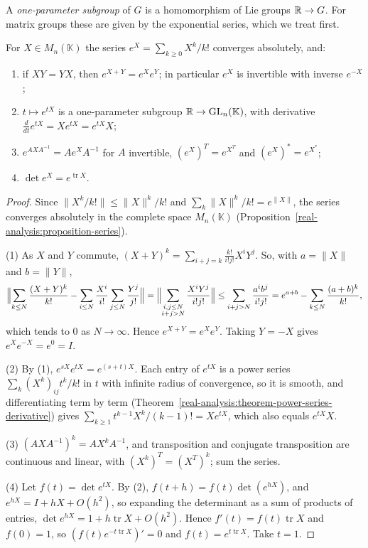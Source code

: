 A \emph{one-parameter subgroup} of $G$ is a homomorphism of Lie groups $\mathbb{R} \to G$. For matrix groups these are given by the exponential series, which we
treat first.

\begin{lemma}\label{lie-groups:lemma-matrix-exponential}
For $X \in M_n(\mathbb{K})$ the series $e^X = \sum_{k \geq 0}X^k/k!$ converges absolutely, and:
\begin{enumerate}
\item if $XY = YX$, then $e^{X+Y} = e^Xe^Y$; in particular $e^X$ is invertible with inverse $e^{-X}$;
\item $t \mapsto e^{tX}$ is a one-parameter subgroup $\mathbb{R} \to \mathrm{GL}_n(\mathbb{K})$, with derivative $\frac{d}{dt}e^{tX} = Xe^{tX} = e^{tX}X$;
\item $e^{AXA^{-1}} = Ae^XA^{-1}$ for $A$ invertible, $(e^X)^T = e^{X^T}$ and $(e^X)^* = e^{X^*}$;
\item $\det e^X = e^{\operatorname{tr}X}$.
\end{enumerate}
\end{lemma}

\begin{proof}
Since $\|X^k/k!\| \leq \|X\|^k/k!$ and $\sum_k\|X\|^k/k! = e^{\|X\|}$, the series converges absolutely in the complete space $M_n(\mathbb{K})$
(Proposition~\ref{real-analysis:proposition-series}).

(1) As $X$ and $Y$ commute, $(X + Y)^k = \sum_{i+j=k}\frac{k!}{i!j!}X^iY^j$. So, with $a = \|X\|$ and $b = \|Y\|$,
\[
\Bigl\|\sum_{k \leq N}\frac{(X + Y)^k}{k!} - \sum_{i \leq N}\frac{X^i}{i!}\sum_{j \leq N}\frac{Y^j}{j!}\Bigr\| = \Bigl\|\sum_{\substack{i, j \leq N\\ i + j > N}}\frac{X^iY^j}{i!j!}\Bigr\|
\leq \sum_{i + j > N}\frac{a^ib^j}{i!j!} = e^{a+b} - \sum_{k \leq N}\frac{(a + b)^k}{k!},
\]
which tends to $0$ as $N \to \infty$. Hence $e^{X+Y} = e^Xe^Y$. Taking $Y = -X$ gives $e^Xe^{-X} = e^0 = I$.

(2) By (1), $e^{sX}e^{tX} = e^{(s+t)X}$. Each entry of $e^{tX}$ is a power series $\sum_k(X^k)_{ij}t^k/k!$ in $t$ with infinite radius of convergence, so it is
smooth, and differentiating term by term (Theorem~\ref{real-analysis:theorem-power-series-derivative}) gives $\sum_{k \geq 1}t^{k-1}X^k/(k - 1)! = Xe^{tX}$,
which also equals $e^{tX}X$.

(3) $(AXA^{-1})^k = AX^kA^{-1}$, and transposition and conjugate transposition are continuous and linear, with $(X^k)^T = (X^T)^k$; sum the series.

(4) Let $f(t) = \det e^{tX}$. By (2), $f(t + h) = f(t)\det(e^{hX})$, and $e^{hX} = I + hX + O(h^2)$, so expanding the determinant as a sum of products of entries,
$\det e^{hX} = 1 + h\operatorname{tr}X + O(h^2)$. Hence $f'(t) = f(t)\operatorname{tr}X$ and $f(0) = 1$, so $(f(t)e^{-t\operatorname{tr}X})' = 0$ and
$f(t) = e^{t\operatorname{tr}X}$. Take $t = 1$.
\end{proof}

